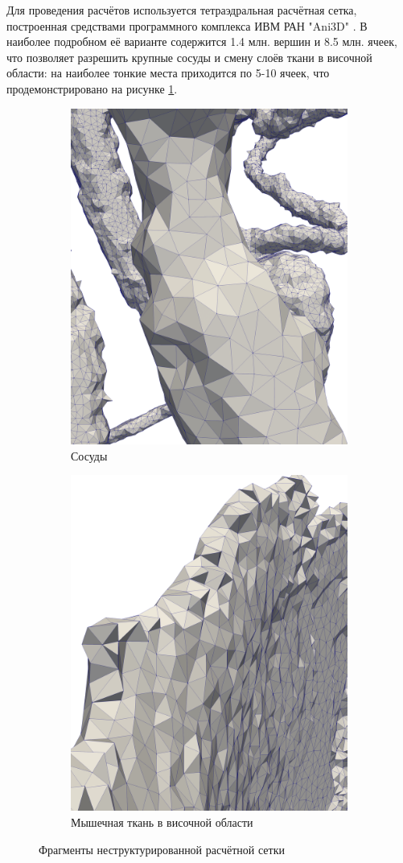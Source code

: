 Для проведения расчётов используется тетраэдральная расчётная сетка, построенная средствами 
программного комплекса ИВМ РАН "Ani3D" \cite{ani3d}. 
В наиболее подробном её варианте содержится 1.4 млн. вершин и 8.5 млн. ячеек, 
что позволяет разрешить крупные сосуды и смену слоёв ткани в височной области: 
на наиболее тонкие места приходится по 5-10 ячеек, что продемонстрировано на рисунке 
\ref{fig:refined-grid}. 
\begin{figure}[H]
\centering
\begin{subfigure}{.5\textwidth}
  \centering
  \includegraphics[width=0.7\linewidth]{pictures/skull/grid-vessels.png}
  \caption{Сосуды}
\end{subfigure}%
\begin{subfigure}{.5\textwidth}
  \centering
  \includegraphics[width=0.7\linewidth]{pictures/skull/grid-muscles.png}
  \caption{Мышечная ткань в височной области}
\end{subfigure}
\caption{Фрагменты неструктурированной расчётной сетки}
\label{fig:refined-grid}
\end{figure}

